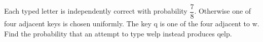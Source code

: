 Each typed letter is independently correct with probability $\dfrac{7}{8}$. Otherwise one of four adjacent keys is chosen uniformly. The key q is one of the four adjacent to w. Find the probability that an attempt to type welp instead produces qelp.
